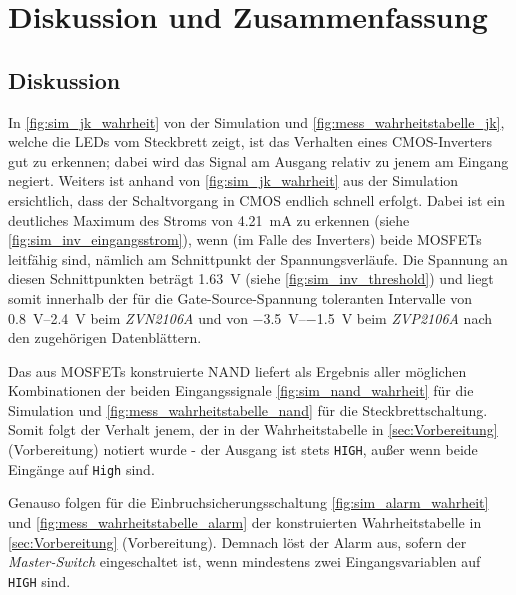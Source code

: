 \documentclass[12pt,english,ngerman]{scrartcl}
\begin{document}
\section{Diskussion und Zusammenfassung}\label{sec:Diskussion} 
\subsection{Diskussion}
In \autoref{fig:sim_jk_wahrheit} von der Simulation und
\autoref{fig:mess_wahrheitstabelle_jk}, welche die LEDs vom Steckbrett zeigt,
ist das Verhalten eines CMOS-Inverters gut zu erkennen; dabei wird das Signal
am Ausgang relativ zu jenem am Eingang negiert.
Weiters ist anhand von \autoref{fig:sim_jk_wahrheit} aus der Simulation ersichtlich, dass
der Schaltvorgang in CMOS endlich schnell erfolgt. Dabei ist ein deutliches
Maximum des Stroms von \SI{4,21}{\milli \ampere} zu erkennen (siehe \autoref{fig:sim_inv_eingangsstrom}), 
wenn (im Falle des Inverters) beide MOSFETs
leitfähig sind, nämlich am Schnittpunkt der Spannungsverläufe.
Die Spannung an diesen Schnittpunkten beträgt \SI{1,63}{\volt} 
(siehe \autoref{fig:sim_inv_threshold}) und liegt
somit innerhalb der für die Gate-Source-Spannung toleranten Intervalle
von \SIrange{0.8}{2.4}{\volt} beim \textit{ZVN2106A} und von
\SIrange{-3.5}{-1.5}{\volt} beim \textit{ZVP2106A} nach den zugehörigen Datenblättern.

Das aus MOSFETs konstruierte NAND liefert als Ergebnis aller möglichen
Kombinationen der beiden Eingangssignale \autoref{fig:sim_nand_wahrheit} für die Simulation
und \autoref{fig:mess_wahrheitstabelle_nand} für die Steckbrettschaltung.
Somit folgt der Verhalt jenem, der in der Wahrheitstabelle in \autoref{sec:Vorbereitung}
(Vorbereitung) notiert wurde - der Ausgang ist stets \texttt{HIGH}, außer wenn
beide Eingänge auf \texttt{High} sind.

Genauso folgen für die Einbruchsicherungsschaltung \autoref{fig:sim_alarm_wahrheit} 
und \autoref{fig:mess_wahrheitstabelle_alarm}
der konstruierten Wahrheitstabelle in \autoref{sec:Vorbereitung} (Vorbereitung).
Demnach löst der Alarm aus, sofern der \textit{Master-Switch} eingeschaltet ist, 
wenn mindestens
zwei Eingangsvariablen auf \texttt{HIGH} sind.
\end{document}
